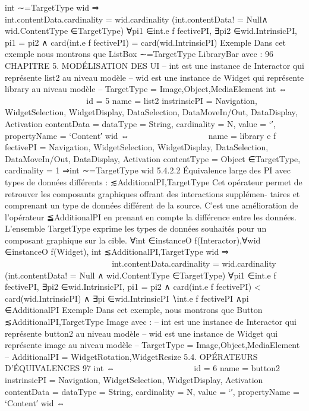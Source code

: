 \documentclass{article}
\begin{document}
int ∼=TargetType wid ⇒























int.contentData.cardinality = wid.cardinality
(int.contentData! = Null∧
wid.ContentType ∈TargetType)
∀pi1 ∈int.e f fectivePI,
∃pi2 ∈wid.IntrinsicPI,
pi1 = pi2
∧
card(int.e f fectivePI) = card(wid.IntrinsicPI)
Exemple
Dans cet exemple nous montrons que ListBox ∼=TargetType LibraryBar avec :
96
CHAPITRE 5. MODÉLISATION DES UI
– int est une instance de Interactor qui représente list2 au niveau modèle
– wid est une instance de Widget qui représente library au niveau modèle
– TargetType = {Image,Object,MediaElement}
int ⇔



















id = 5
name = list2
instrinsicPI = {Navigation, WidgetSelection,
WidgetDisplay, DataSelection, DataMoveIn/Out,
DataDisplay, Activation}
contentData = {dataType = String, cardinality = N,
value = ‘′, propertyName = ‘Content′}
wid ⇔















name = library
e f fectivePI = {Navigation, WidgetSelection,
WidgetDisplay, DataSelection, DataMoveIn/Out,
DataDisplay, Activation}
contentType = Object ∈TargetType,
cardinality = 1
⇒int ∼=TargetType wid
5.4.2.2
Équivalence large des PI avec types de données différents : ≲AdditionalPI,TargetType
Cet opérateur permet de retrouver les composants graphiques offrant des interactions supplémen-
taires et comprenant un type de données différent de la source. C’est une amélioration de l’opérateur
≦AdditionalPI en prenant en compte la différence entre les données. L’ensemble TargetType exprime
les types de données souhaités pour un composant graphique sur la cible.
∀int ∈instanceO f(Interactor),∀wid ∈instanceO f(Widget),
int ≲AdditionalPI,TargetType wid ⇒



































int.contentData.cardinality = wid.cardinality
(int.contentData! = Null
∧
wid.ContentType ∈TargetType)
∀pi1 ∈int.e f fectivePI,
∃pi2 ∈wid.IntrinsicPI,
pi1 = pi2
∧
card(int.e f fectivePI) < card(wid.IntrinsicPI)
∧
∃pi ∈wid.IntrinsicPI ∖int.e f fectivePI ∧pi ∈AdditionalPI
Exemple
Dans cet exemple, nous montrons que Button ≲AdditionalPI,TargetType Image avec :
– int est une instance de Interactor qui représente button2 au niveau modèle
– wid est une instance de Widget qui représente image au niveau modèle
– TargetType = {Image,Object,MediaElement}
– AdditionalPI = {WidgetRotation,WidgetResize}
5.4. OPÉRATEURS D’ÉQUIVALENCES
97
int ⇔















id = 6
name = button2
instrinsicPI = {Navigation, WidgetSelection,
WidgetDisplay, Activation}
contentData = {dataType = String, cardinality = N,
value = ‘′, propertyName = ‘Content′}
wid ⇔













\end{document}
